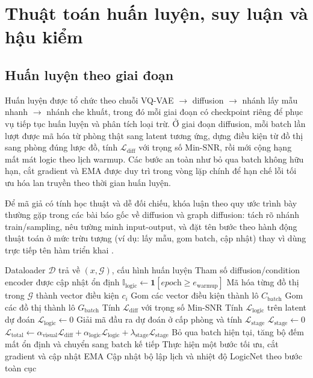 \documentclass[oneside,a4paper,12pt]{extreport}
\begin{document}
\section{Thuật toán huấn luyện, suy luận và hậu kiểm}

\subsection{Huấn luyện theo giai đoạn}
Huấn luyện được tổ chức theo chuỗi VQ-VAE $\rightarrow$ diffusion $\rightarrow$ nhánh lấy mẫu nhanh $\rightarrow$ nhánh che khuất, trong đó mỗi giai đoạn có checkpoint riêng để phục vụ tiếp tục huấn luyện và phân tích loại trừ. Ở giai đoạn diffusion, mỗi batch lần lượt được mã hóa từ phòng thật sang latent tương ứng, dựng điều kiện từ đồ thị sang phòng đúng lược đồ, tính \(\mathcal{L}_{\text{diff}}\) với trọng số Min-SNR, rồi mới cộng hạng mất mát logic theo lịch warmup. Các bước an toàn như bỏ qua batch không hữu hạn, cắt gradient và EMA được duy trì trong vòng lặp chính để hạn chế lỗi tối ưu hóa lan truyền theo thời gian huấn luyện.

Để mã giả có tính học thuật và dễ đối chiếu, khóa luận theo quy ước trình bày thường gặp trong các bài báo gốc về diffusion và graph diffusion: tách rõ nhánh train/sampling, nêu tường minh input-output, và đặt tên bước theo hành động thuật toán ở mức trừu tượng (ví dụ: lấy mẫu, gom batch, cập nhật) thay vì dùng trực tiếp tên hàm triển khai \cite{ho2020ddpm,song2021ddim,vignac2023digress,mouret2015mapelites}.

\begin{algorithm}[H]
\caption{Huấn luyện một epoch diffusion với warmup logic}
\label{alg:train_epoch_diffusion}
\begin{algorithmic}[1]
\Require Dataloader $\mathcal{D}$ trả về $(x,\mathcal{G})$, cấu hình huấn luyện
\Ensure Tham số diffusion/condition encoder được cập nhật ổn định
\State $\mathbb{I}_{\text{logic}} \gets \mathbf{1}\!\left[\textit{epoch} \ge e_{\text{warmup}}\right]$
  \State Mã hóa từng đồ thị trong $\mathcal{G}$ thành vector điều kiện $c_i$
  \State Gom các vector điều kiện thành lô $C_{\text{batch}}$
  \State Gom các đồ thị thành lô $G_{\text{batch}}$
  \State Tính $\mathcal{L}_{\text{diff}}$ với trọng số Min-SNR
    \State Tính $\mathcal{L}_{\text{logic}}$ trên latent dự đoán
  \Else
    \State $\mathcal{L}_{\text{logic}} \gets 0$
  \EndIf
    \State Giải mã đầu ra dự đoán ở cấp phòng và tính $\mathcal{L}_{\text{stage}}$
  \Else
    \State $\mathcal{L}_{\text{stage}} \gets 0$
  \EndIf
  \State $\mathcal{L}_{\text{total}} \gets \alpha_{\text{visual}}\mathcal{L}_{\text{diff}} + \alpha_{\text{logic}}\mathcal{L}_{\text{logic}} + \lambda_{\text{stage}}\mathcal{L}_{\text{stage}}$
    \State Bỏ qua batch hiện tại, tăng bộ đếm mất ổn định và chuyển sang batch kế tiếp
  \EndIf
  \State Thực hiện một bước tối ưu, cắt gradient và cập nhật EMA
\EndFor
\State Cập nhật bộ lập lịch và nhiệt độ LogicNet theo bước toàn cục
\end{algorithmic}
\end{algorithm}
\end{document}
